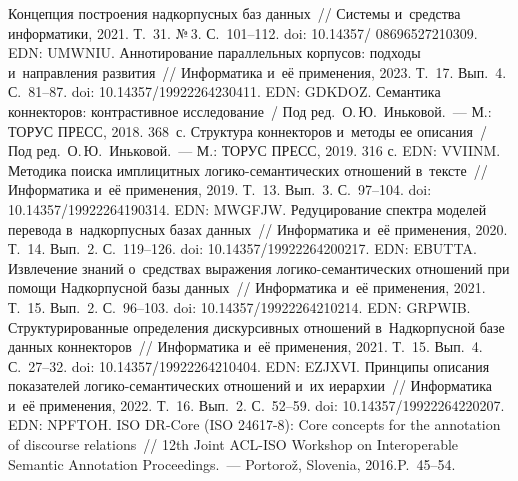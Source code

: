 \begin{multicols}{2}
{{\begin{thebibliography}{99}
 Концепция построения надкорпусных баз данных~// Системы и~средства информатики, 2021. Т.~31. №\,3. С.~101--112.
doi: 10.14357/ 08696527210309. EDN: UMWNIU.
 Аннотирование параллельных корпусов: подходы и~направления 
развития~// Информатика и~её применения, 2023. Т.~17. Вып.~4. С.~81--87. doi: 10.14357/19922264230411. 
EDN: GDKDOZ.
Семантика коннекторов: контрастивное исследование~/ Под ред.\ О.\,Ю.~Иньковой.~--- М.: 
ТОРУС ПРЕСС, 2018. 368~с.
Структура коннекторов и~методы ее описания~/ Под ред.\ О.\,Ю.~Иньковой.~--- М.: ТОРУС 
ПРЕСС, 2019. 316 с. EDN: VVIINM.
 Методика поиска имплицитных ло\-ги\-ко-се\-ман\-ти\-че\-ских 
отношений в~текс\-те~// Информатика и~её применения, 2019. Т.~13. Вып.~3. С.~97--104. 
doi: 10.14357/19922264190314. EDN: MWGFJW.
 Редуцирование спект\-ра моделей перевода в~надкорпусных 
базах данных~// Информатика и~её применения, 2020. Т.~14. Вып.~2. С.~119--126. 
doi:  10.14357/19922264200217. EDN: EBUTTA.
 Извлечение знаний о~средствах выражения 
логико-семантических отношений при помощи Надкорпусной базы данных~// Информатика и~её 
применения, 2021. Т.~15. Вып.~2. С.~96--103.
doi:  10.14357/19922264210214. EDN: \mbox{GRPWIB}.
 Структурированные определения дискурсивных 
отношений в~Надкорпусной базе данных коннекторов~// Информатика и~её применения, 
2021. Т.~15. Вып.~4. С.~27--32. doi: 10.14357/19922264210404. EDN: EZJXVI.
 Принципы описания показателей 
логико-семантических отношений и~их иерархии~// Информатика и~её применения, 2022. Т.~16. 
Вып.~2. С.~52--59. doi: 10.14357/19922264220207. EDN: NPFTOH.
 ISO DR-Core (ISO 24617-8): Core concepts for the annotation of 
discourse relations~// 12th Joint ACL-ISO Workshop on Interoperable Semantic Annotation 
Proceedings.~--- \mbox{Portoro{\hspace*{-0.6pt}\!\ptb\v{z}}}, Slovenia, 2016.\linebreak P.~45--54.

\end{thebibliography}

 }
 }

\end{multicols}

